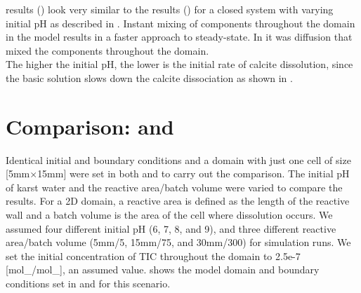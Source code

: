 \MATLAB results () look very similar to the \DuMuX results () 
for a closed system with varying initial pH as described in . Instant mixing of components throughout the domain 
in the \MATLAB model results in a faster approach to steady-state. In \DuMuX it was diffusion that mixed the components throughout the domain. \\

The higher the initial pH, the lower is the initial rate of calcite dissolution, since the basic solution slows down the calcite dissociation 
as shown in .

\section{Comparison: \DuMuX and \MATLAB} \label{sec:dvm}
Identical initial and boundary conditions and a domain with just one cell of size [5mm$\times$15mm] were set in both \MATLAB and \DuMuX 
to carry out the comparison. The initial pH of karst water and the reactive area/batch volume were varied to compare the results. 
For a 2D domain, a reactive area is defined as the length of the reactive wall and a batch volume is the area of the cell where dissolution occurs. 
We assumed four different initial pH (6, 7, 8, and 9), and three different reactive area/batch 
volume (5mm/5, 15mm/75, and 30mm/300) for simulation runs. We set the initial concentration of TIC 
throughout the domain to 2.5e-7 [mol\_/mol\_], 
an assumed value.  shows the model domain and boundary conditions set in \MATLAB and \DuMuX for this scenario. \\

